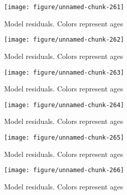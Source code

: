 \documentclass[a4paper]{article}\usepackage{graphicx, color}
\makeatletter
\def\maxwidth{ %
  \ifdim\Gin@nat@width>\linewidth
    \linewidth
  \else
    \Gin@nat@width
  \fi
}
\newenvironment{knitrout}{}{} %
\makeatother
\begin{document}
\begin{knitrout}
\color{fgcolor}\begin{figure}[H]


{\centering \texttt{[image: figure/unnamed-chunk-261]} 

}

\caption[Model residuals]{Model residuals. Colors represent ages\label{fig:unnamed-chunk-261}}
\end{figure}
\begin{figure}[H]


{\centering \texttt{[image: figure/unnamed-chunk-262]} 

}

\caption[Model residuals]{Model residuals. Colors represent ages\label{fig:unnamed-chunk-262}}
\end{figure}
\begin{figure}[H]


{\centering \texttt{[image: figure/unnamed-chunk-263]} 

}

\caption[Model residuals]{Model residuals. Colors represent ages\label{fig:unnamed-chunk-263}}
\end{figure}
\begin{figure}[H]


{\centering \texttt{[image: figure/unnamed-chunk-264]} 

}

\caption[Model residuals]{Model residuals. Colors represent ages\label{fig:unnamed-chunk-264}}
\end{figure}
\begin{figure}[H]


{\centering \texttt{[image: figure/unnamed-chunk-265]} 

}

\caption[Model residuals]{Model residuals. Colors represent ages\label{fig:unnamed-chunk-265}}
\end{figure}
\begin{figure}[H]


{\centering \texttt{[image: figure/unnamed-chunk-266]} 

}

\caption[Model residuals]{Model residuals. Colors represent ages\label{fig:unnamed-chunk-266}}
\end{figure}
\begin{figure}[H]



\end{figure}
\end{knitrout}
\end{document}
